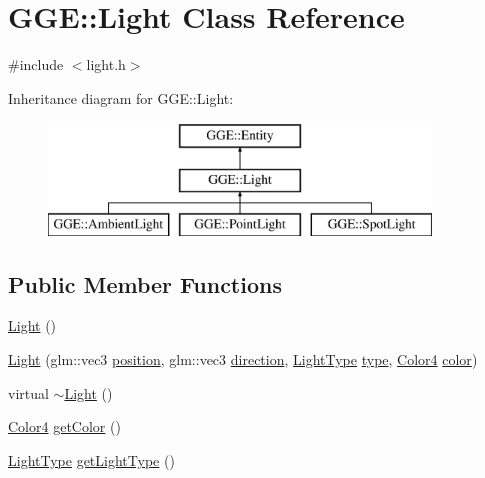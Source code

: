 \hypertarget{class_g_g_e_1_1_light}{\section{G\+G\+E\+:\+:Light Class Reference}
\label{class_g_g_e_1_1_light}
}


{\ttfamily \#include $<$light.\+h$>$}

Inheritance diagram for G\+G\+E\+:\+:Light\+:\begin{figure}[H]
\begin{center}
\leavevmode
\includegraphics[height=3.000000cm]{class_g_g_e_1_1_light}
\end{center}
\end{figure}
\subsection*{Public Member Functions}
\begin{DoxyCompactItemize}
\item 
\hyperlink{class_g_g_e_1_1_light_ac10d3c4648c68b6f9ecc08b6aaa54736}{Light} ()
\item 
\hyperlink{class_g_g_e_1_1_light_ad1b55887fedae158ebf806f3858e9a10}{Light} (glm\+::vec3 \hyperlink{class_g_g_e_1_1_entity_a38a9fa01bfaf37ca415181ba6a179d3f}{position}, glm\+::vec3 \hyperlink{class_g_g_e_1_1_entity_a80c69365314541244f26e4a15b4223d8}{direction}, \hyperlink{namespace_g_g_e_abf6b28d5fd20f356a5ad88fec0789eff}{Light\+Type} \hyperlink{class_g_g_e_1_1_light_ae4d6aecd16e4e8ec0d1601acaa71400d}{type}, \hyperlink{namespace_g_g_e_aff43741fd756c83cbfd5d4d5cd9fcf41}{Color4} \hyperlink{class_g_g_e_1_1_light_a4d2f4605abc44637feac0d0312ce0717}{color})
\item 
virtual \hyperlink{class_g_g_e_1_1_light_a0bafb0a9f8f149d31ab109eb208dbef2}{$\sim$\+Light} ()
\item 
\hyperlink{namespace_g_g_e_aff43741fd756c83cbfd5d4d5cd9fcf41}{Color4} \hyperlink{class_g_g_e_1_1_light_aaedc1c8a70cd6c65651b64d648590d61}{get\+Color} ()
\item 
\hyperlink{namespace_g_g_e_abf6b28d5fd20f356a5ad88fec0789eff}{Light\+Type} \hyperlink{class_g_g_e_1_1_light_a6aa80e3d94ede0f9d6f821580ad4f015}{get\+Light\+Type} ()
\end{DoxyCompactItemize}

